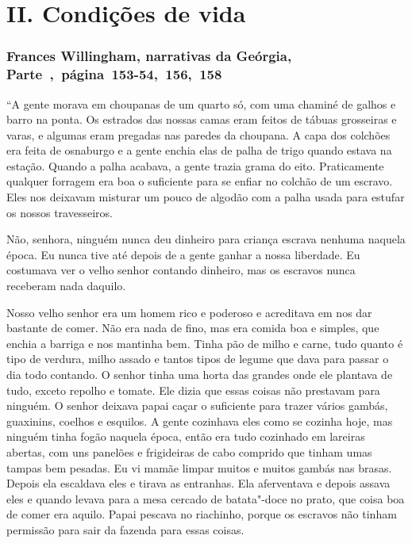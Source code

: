 \chapter{II. Condições de vida}

\subsection{Frances Willingham, narrativas da Geórgia, Parte~,~página~153-54,~156,~158}
\label{ref296}

``A gente morava em choupanas de um quarto só, com uma chaminé de galhos
e barro na ponta. Os estrados das nossas camas eram feitos de tábuas
grosseiras e varas, e algumas eram pregadas nas paredes da choupana. A
capa dos colchões era feita de osnaburgo e a gente enchia elas de palha
de trigo quando estava na estação. Quando a palha acabava, a gente
trazia grama do eito. Praticamente qualquer forragem era boa o
suficiente para se enfiar no colchão de um escravo. Eles nos deixavam
misturar um pouco de algodão com a palha usada para estufar os nossos
travesseiros.

Não, senhora, ninguém nunca deu dinheiro para criança escrava
nenhuma naquela época. Eu nunca tive até depois de a gente ganhar a
nossa liberdade. Eu costumava ver o velho senhor contando dinheiro, mas
os escravos nunca receberam nada daquilo.

Nosso velho senhor era um homem rico e poderoso e acreditava em nos dar %
bastante de comer. Não era nada de fino, mas era comida boa e simples,
que enchia a barriga e nos mantinha bem. Tinha pão de milho e carne,
tudo quanto é tipo de verdura, milho assado e tantos tipos de legume que
dava para passar o dia todo contando. O senhor tinha uma horta das
grandes onde ele plantava de tudo, exceto repolho e tomate. Ele dizia
que essas coisas não prestavam para ninguém. O senhor deixava papai
caçar o suficiente para trazer vários gambás, guaxinins, coelhos e
esquilos. A gente cozinhava eles como se cozinha hoje, mas ninguém tinha
fogão naquela época, então era tudo cozinhado em lareiras abertas, com
uns panelões e frigideiras de cabo comprido que tinham umas tampas bem
pesadas. Eu vi mamãe limpar muitos e muitos gambás nas brasas. Depois
ela escaldava eles e tirava as entranhas. Ela aferventava e depois
assava eles e quando levava para a mesa cercado de batata"-doce no prato,
que coisa boa de comer era aquilo. Papai pescava no riachinho, porque os
escravos não tinham permissão para sair da fazenda para essas coisas.

